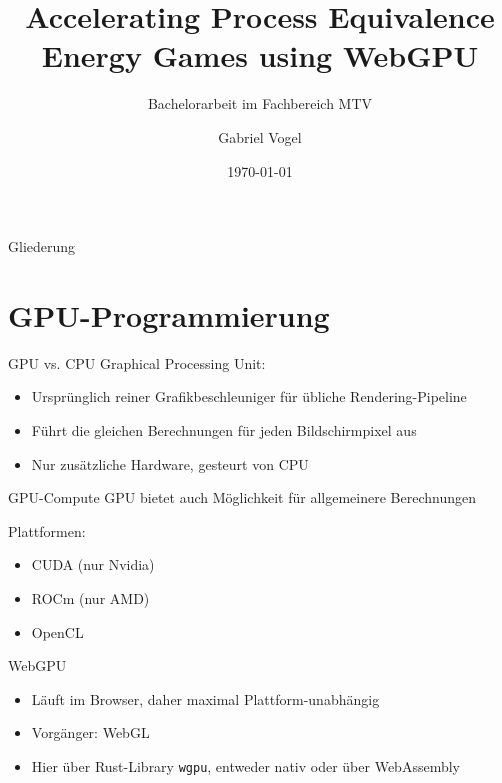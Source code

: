 \documentclass{beamer}
\title[gpuequiv]{Accelerating Process Equivalence Energy Games using WebGPU}
\subtitle{Bachelorarbeit im Fachbereich MTV}
\author{Gabriel Vogel}
\date{\today}
\begin{document}
\begin{frame}
    \titlepage
\end{frame}

\begin{frame}{Gliederung}
    \tableofcontents
\end{frame}


\section{GPU-Programmierung}

\begin{frame}{GPU vs. CPU}
    Graphical Processing Unit:
    \begin{itemize}
        \item Ursprünglich reiner Grafikbeschleuniger für übliche
            Rendering-Pipeline
        \item Führt die gleichen Berechnungen für jeden Bildschirmpixel aus
        \item Nur zusätzliche Hardware, gesteurt von CPU
    \end{itemize}
\end{frame}

\begin{frame}{GPU-Compute}
    GPU bietet auch Möglichkeit für allgemeinere Berechnungen

    Plattformen:
    \begin{itemize}
        \item CUDA (nur Nvidia)
        \item ROCm (nur AMD)
        \item OpenCL
    \end{itemize}
\end{frame}

\begin{frame}{WebGPU}
    \begin{itemize}
        \item Läuft im Browser, daher maximal Plattform-unabhängig
        \item Vorgänger: WebGL
        \item Hier über Rust-Library \texttt{wgpu},
            entweder nativ oder über WebAssembly
    \end{itemize}



\end{frame}
\end{document}
